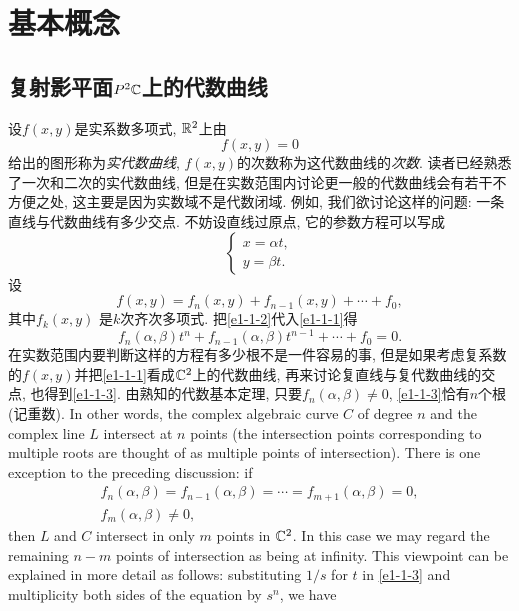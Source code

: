 \chapter{基本概念}\label{c1}
\section{复射影平面\texorpdfstring{$P^2\mathbb{C}$}{P2C}上的代数曲线}\label{s1-1}
设$f(x,y)$是实系数多项式, $\mathbb{R}^2$上由
\begin{equation}\label{e1-1-1}
    f(x,y)=0
\end{equation}
给出的图形称为\textit{实代数曲线}, $f(x,y)$的次数称为这代数曲线的\textit{次数}. 读者已经熟悉了一次和二次的实代数曲线, 但是在实数范围内讨论更一般的代数曲线会有若干不方便之处, 这主要是因为实数域不是代数闭域. 例如, 我们欲讨论这样的问题: 一条直线与代数曲线有多少交点. 不妨设直线过原点, 它的参数方程可以写成\begin{equation}\label{e1-1-2}
    \begin{cases}
        x=\alpha t, \\
        y=\beta t. 
    \end{cases}
\end{equation}
设
\[f(x,y)=f_n(x,y)+f_{n-1}(x,y)+\cdots+f_0, \]
其中$f_k(x,y)$ 是$k$次齐次多项式. 把\eqref{e1-1-2}代入\eqref{e1-1-1}得
\begin{equation}\label{e1-1-3}
    f_n(\alpha,\beta)t^n+f_{n-1}(\alpha,\beta)t^{n-1}+\cdots+f_0=0. 
\end{equation}
在实数范围内要判断这样的方程有多少根不是一件容易的事, 但是如果考虑复系数的$f(x,y)$并把\eqref{e1-1-1}看成$\mathbb{C}^2$上的代数曲线, 再来讨论复直线与复代数曲线的交点, 也得到\eqref{e1-1-3}. 由熟知的代数基本定理, 只要$f_n(\alpha,\beta)\neq0$, \eqref{e1-1-3}恰有$n$个根(记重数). In other words, the complex algebraic curve $C$ of degree $n$ and the complex line $L$ intersect at $n$ points (the intersection points corresponding to multiple roots are thought of as multiple points of intersection). There is one exception to the preceding discussion: if 
\begin{gather*}
    f_n(\alpha,\beta)=f_{n-1}(\alpha,\beta)=\cdots=f_{m+1}(\alpha,\beta)=0, \\
    f_m(\alpha,\beta)\neq0, 
\end{gather*}
then $L$ and $C$ intersect in only $m$ points in $\mathbb{C}^2$. In this case we may regard the remaining $n-m$ points of intersection as being at infinity. This viewpoint can be explained in more detail as follows: substituting $1/s$ for $t$ in \eqref{e1-1-3} and multiplicity both sides of the equation by $s^n$, we have 
